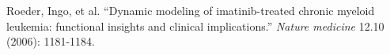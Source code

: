 \documentclass[11.5pt]{article}
\begin{document}
\newpage

\begin{thebibliography}{9}
  Roeder, Ingo, et al. ``Dynamic modeling of imatinib-treated chronic myeloid leukemia: functional insights and clinical implications.'' {\itshape Nature medicine} 12.10 (2006): 1181-1184.
\end{thebibliography}
\newpage

\end{document}
